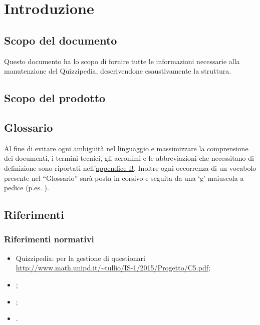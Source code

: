 \documentclass[a4paper, titlepage]{article}
\begin{document}
\pagestyle{fancy}	

\maketitle



\newpage
\tableofcontents

\newpage
\listoffigures

\newpage
\listoftables

\newpage
\clearpage
{}

	\section{Introduzione}
	\subsection{Scopo del documento}
	Questo documento ha lo scopo di fornire tutte le informazioni necessarie alla manutenzione del 
	Quizzipedia, descrivendone esaustivamente la struttura.
	
	\subsection{Scopo del prodotto}
	\SCOPO
	
	\subsection{Glossario}
	Al fine di evitare ogni ambiguità nel linguaggio e massimizzare la comprensione dei documenti, i termini tecnici, gli acronimi e le abbreviazioni che necessitano di definizione sono riportati nell'\hyperref[gl]{appendice B}.
	Inoltre ogni occorrenza di un vocabolo presente nel “Glossario” sarà posta in corsivo e seguita da
	una ‘g’ maiuscola a pedice (p.es. ).
	
	\subsection{Riferimenti}	
	\subsubsection{Riferimenti normativi}
	\begin{itemize}
		\item {} Quizzipedia:  per la gestione di questionari \newline \url{http://www.math.unipd.it/~tullio/IS-1/2015/Progetto/C5.pdf};
		\item {} \NdPdoc;
		\item {} \AdRdoc;
		\item {} \STdoc.
		
	\end{itemize}
\end{document}
